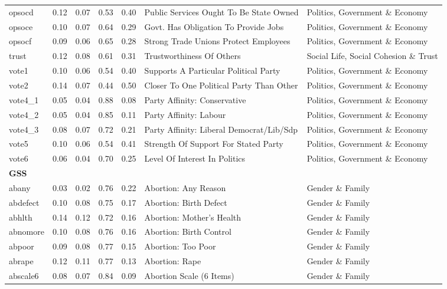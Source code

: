 \documentclass[
  12pt,
]{article}
\begin{document}
\begin{landscape}
\begin{scriptsize}
\begin{longtable}{|p{1.75in}|p{0.3in}|p{0.3in}|p{0.3in}|p{0.3in}|p{2.5in}|p{2.5in}}
opsocd & 0.12 & 0.07 & 0.53 & 0.40 & Public Services Ought To Be State Owned & Politics, Government \& Economy \\ 
opsoce & 0.10 & 0.07 & 0.64 & 0.29 & Govt. Has Obligation To Provide Jobs & Politics, Government \& Economy \\ 
opsocf & 0.09 & 0.06 & 0.65 & 0.28 & Strong Trade Unions Protect Employees & Politics, Government \& Economy \\ 
trust & 0.12 & 0.08 & 0.61 & 0.31 & Trustworthiness Of Others & Social Life, Social Cohesion \& Trust \\ 
vote1 & 0.10 & 0.06 & 0.54 & 0.40 & Supports A Particular Political Party & Politics, Government \& Economy \\ 
vote2 & 0.14 & 0.07 & 0.44 & 0.50 & Closer To One Political Party Than Other & Politics, Government \& Economy \\ 
vote4\_1 & 0.05 & 0.04 & 0.88 & 0.08 & Party Affinity: Conservative & Politics, Government \& Economy \\ 
vote4\_2 & 0.05 & 0.04 & 0.85 & 0.11 & Party Affinity: Labour & Politics, Government \& Economy \\ 
vote4\_3 & 0.08 & 0.07 & 0.72 & 0.21 & Party Affinity: Liberal Democrat/Lib/Sdp & Politics, Government \& Economy \\ 
vote5 & 0.10 & 0.06 & 0.54 & 0.41 & Strength Of Support For Stated Party & Politics, Government \& Economy \\ 
vote6 & 0.06 & 0.04 & 0.70 & 0.25 & Level Of Interest In Politics & Politics, Government \& Economy \\ 
\midrule
\multicolumn{7}{l}{\textbf{GSS}} \\ 
\midrule
abany & 0.03 & 0.02 & 0.76 & 0.22 & Abortion: Any Reason & Gender \& Family \\ 
abdefect & 0.10 & 0.08 & 0.75 & 0.17 & Abortion: Birth Defect & Gender \& Family \\ 
abhlth & 0.14 & 0.12 & 0.72 & 0.16 & Abortion: Mother's Health & Gender \& Family \\ 
abnomore & 0.10 & 0.08 & 0.76 & 0.16 & Abortion: Birth Control & Gender \& Family \\ 
abpoor & 0.09 & 0.08 & 0.77 & 0.15 & Abortion: Too Poor & Gender \& Family \\ 
abrape & 0.12 & 0.11 & 0.77 & 0.13 & Abortion: Rape & Gender \& Family \\ 
abscale6 & 0.08 & 0.07 & 0.84 & 0.09 & Abortion Scale (6 Items) & Gender \& Family \\ 

\end{longtable}
\end{scriptsize}
\end{landscape}
\end{document}
